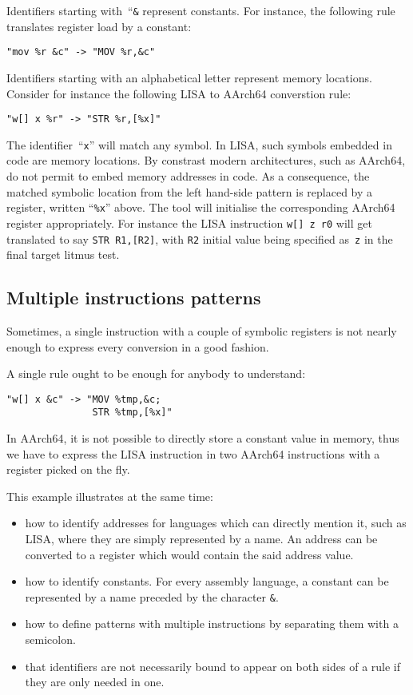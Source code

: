 Identifiers starting with~``\verb+&+ represent constants.
For instance, the following rule translates register load by a constant:
\begin{verbatim}
"mov %r &c" -> "MOV %r,&c"
\end{verbatim}

Identifiers starting with an alphabetical letter represent memory locations.
Consider for instance the following LISA to AArch64 converstion rule:
\begin{verbatim}
"w[] x %r" -> "STR %r,[%x]"
\end{verbatim}
The identifier~``\verb+x+'' will match any symbol.
In LISA, such symbols embedded in code are memory locations.
By constrast modern architectures, such as AArch64, do
not permit to embed memory addresses in code.
As a consequence, the matched symbolic location from the left hand-side
pattern is replaced by a register, written ``\verb+%x+'' above.
The tool \jingle{} will initialise the corresponding AArch64 register
appropriately.
For instance the LISA instruction \verb+w[] z r0+ will get translated
to say \verb+STR R1,[R2]+, with \verb+R2+ initial value being specified
as~\verb+z+ in the final target litmus test.



\subsection{Multiple instructions patterns}
Sometimes, a single instruction with a couple of symbolic registers
is not nearly enough to express every conversion in a good fashion.

A single rule ought to be enough for anybody to understand:
\begin{verbatim}
"w[] x &c" -> "MOV %tmp,&c;
               STR %tmp,[%x]"
\end{verbatim}

In AArch64, it is not possible to directly store a constant value in memory,
thus we have to express the LISA instruction in two AArch64 instructions
with a register picked on the fly.

This example illustrates at the same time:
\begin{itemize}
\item how to identify addresses for languages which can directly mention it,
such as LISA, where they are simply represented by a name. An address can
be converted to a register which would contain the said address value.
\item how to identify constants. For every assembly language, a constant can be
represented by a name preceded by the character \verb+&+.
\item how to define patterns with multiple instructions by separating them
with a semicolon.
\item that identifiers are not necessarily bound to appear on both sides of
a rule if they are only needed in one.
\end{itemize}

